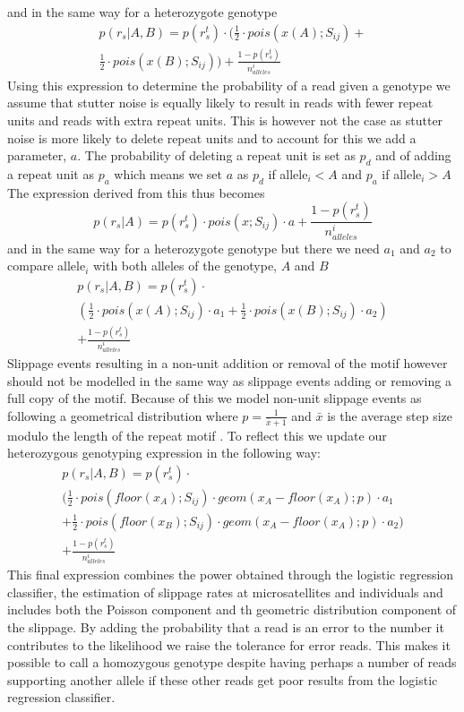 \documentclass{bioinfo}
\begin{document}
\begin{methods}
and in the same way for a heterozygote genotype 
\begin{multline}
p(r_s|A,B) = p(r^t_s) \cdot (\frac{1}{2} \cdot pois(x(A);S_{ij})+ \\
\frac{1}{2} \cdot pois(x(B);S_{ij})) + \frac{1-p(r^t_s)}{n^i_{alleles}}
\end{multline}
Using this expression to determine the probability of a read given a genotype we assume that stutter noise is equally likely to result in reads with fewer repeat units and reads with extra repeat units. This is however not the case as stutter noise is more likely to delete repeat units and to account for this we add a parameter, $a$. The probability of deleting a repeat unit is set as $p_d$ and of adding a repeat unit as $p_a$ which means we set $a$ as $p_d$ if allele$_i < A$ and $p_a$ if allele$_i > A$ The expression derived from this thus becomes 
\begin{equation}
p(r_s|A) = p(r^t_s) \cdot pois(x;S_{ij}) \cdot a + \frac{1-p(r^t_s)}{n^i_{alleles}}
\label{eq:likelihood3}
\end{equation}
and in the same way for a heterozygote genotype but there we need $a_1$ and $a_2$ to compare allele$_i$ with both alleles of the genotype, $A$ and $B$
\begin{multline}
p(r_s|A,B) = p(r^t_s) \cdot \\
(\frac{1}{2} \cdot pois(x(A);S_{ij}) \cdot a_1+ \frac{1}{2} \cdot pois(x(B);S_{ij})\cdot a_2)\\
+ \frac{1-p(r^t_s)}{n^i_{alleles}}
\label{eq:likelihood3.5}
\end{multline}
Slippage events resulting in a non-unit addition or removal of the motif however should not be modelled in the same way as slippage events adding or removing a full copy of the motif. Because of this we model non-unit slippage events as following a geometrical distribution where $p = \frac{1}{\bar{x}+1}$ and $\bar{x}$ is the average step size modulo the length of the repeat motif \cite{Gymrek2012}.
To reflect this we update our heterozygous genotyping expression in the following way:
\begin{multline}
    p(r_s|A,B) = p(r^t_s) \cdot \\
    \biggl(\frac{1}{2} \cdot pois(floor(x_A);S_{ij}) \cdot geom(x_A-floor(x_A);p) \cdot a_1 \\ + \frac{1}{2} \cdot pois(floor(x_B);S_{ij})\cdot geom(x_A-floor(x_A);p) \cdot a_2 \biggr) \\
    + \frac{1-p(r^t_s)}{n^i_{alleles}}
    \label{eq:likelihood4}
\end{multline}
This final expression combines the power obtained through the logistic regression classifier, the estimation of slippage rates at microsatellites and individuals and includes both the Poisson component and th geometric distribution component of the slippage. By adding the probability that a read is an error to the number it contributes to the likelihood we raise the tolerance for error reads. This makes it possible to call a homozygous genotype despite having perhaps a number of reads supporting another allele if these other reads get poor results from the logistic regression classifier.

\end{methods}
\end{document}
